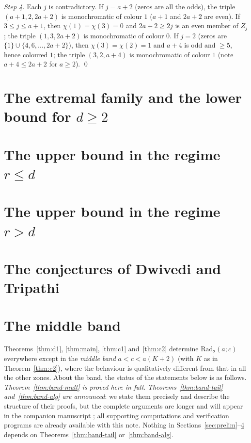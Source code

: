 \documentclass[11pt]{article}
\theoremstyle{remark}
\theoremstyle{definition}
\newcommand{\Rad}{\mathrm{Rad}_2}
\begin{document}
\emph{Step 4.} Each $j$ is contradictory.
If $j = a+2$ (zeros are all the odds), the triple $(a+1, 2, 2a+2)$ is
monochromatic of colour $1$ ($a+1$ and $2a+2$ are even).
If $3 \le j \le a+1$, then $\chi(1) = \chi(3) = 0$ and $2a+2 \ge 2j$ is an
even member of $Z_j$; the triple $(1, 3, 2a+2)$ is monochromatic of colour
$0$.
If $j = 2$ (zeros are $\{1\} \cup \{4, 6, \dots, 2a+2\}$), then
$\chi(3) = \chi(2) = 1$ and $a+4$ is odd and $\ge 5$, hence coloured $1$;
the triple $(3, 2, a+4)$ is monochromatic of colour $1$ (note
$a + 4 \le 2a+2$ for $a \ge 2$). \qed

\section{The extremal family and the lower bound for $d \ge 2$}\label{sec:family}


\section{The upper bound in the regime $r \le d$}\label{sec:ub1}


\section{The upper bound in the regime $r > d$}\label{sec:ub2}


\section{The conjectures of Dwivedi and Tripathi}\label{sec:conj}


\section{The middle band}\label{sec:band}

Theorems~\ref{thm:d1}, \ref{thm:main}, \ref{thm:c1} and~\ref{thm:c2}
determine $\Rad(a;c)$ everywhere
except in the \emph{middle band} $a < c < a(K+2)$ (with $K$ as in
Theorem~\ref{thm:c2}), where the behaviour is qualitatively different from
that in all the other zones. About the band, the
status of the statements below is as follows.
\emph{Theorem~\ref{thm:band-mult} is proved here in full.}
\emph{Theorems~\ref{thm:band-tail} and~\ref{thm:band-alg} are announced}:
we state them precisely and describe the structure of their proofs, but the
complete arguments are longer and will appear in the companion manuscript
\cite{companion}; all supporting computations and verification programs are
already available with this note. Nothing in
Sections~\ref{sec:prelim}--\ref{sec:conj} depends on
Theorems~\ref{thm:band-tail} or~\ref{thm:band-alg}.
\end{document}
